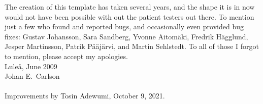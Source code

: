 The creation of this template has taken several years, and the shape it is in now would not have been possible with out the patient testers out there. To mention just a few who found and reported bugs, and occasionally even provided bug fixes: Gustav Johansson, Sara Sandberg, Yvonne Aitomäki, Fredrik Hägglund, Jesper Martinsson, Patrik Pääjärvi, and Martin Sehlstedt. To all of those I forgot to mention, please accept my apologies.\\[2.5cm]
Luleå, June 2009\\
Johan E.\ Carlson \\ \\
Improvements by Tosin Adewumi, October 9, 2021.